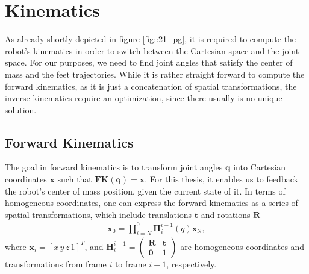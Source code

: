 \FloatBarrier
\section{Kinematics}
\label{sec::24_k}
As already shortly depicted in figure \ref{fig::21_pg}, it is required to compute the robot's kinematics in order to switch between the Cartesian space and the joint space. For our purposes, we need to find joint angles that satisfy the center of mass and the feet trajectories. While it is rather straight forward to compute the forward kinematics, as it is just a concatenation of spatial transformations, the inverse kinematics require an optimization, since there usually is no unique solution.
\FloatBarrier
\subsection{Forward Kinematics}
\label{sec::241_fk}
The goal in forward kinematics is to transform joint angles $\bm{q}$ into Cartesian coordinates $\bm{x}$ such that $\textbf{FK}(\bm{q}) = \bm{x}$. For this thesis, it enables us to feedback the robot's center of mass position, given the current state of it. In terms of homogeneous coordinates, one can express the forward kinematics as a series of spatial transformations, which include translations $\bm{t}$ and rotations $\bm{R}$ 
\begin{align}
	\bm{x}_\text{0} = \prod_{i=N}^{0}\bm{H}_i^{i-1}(q)\bm{x}_\text{N},
\end{align}
where $\bm{x}_i=[x\,y\,z\,1]^T$, and $\bm{H}_i^{i-1}=\begin{pmatrix}\bm{R} & \bm{t} \\ \bm{0} & 1 \end{pmatrix}$ are homogeneous coordinates and transformations from frame $i$ to frame $i-1$, respectively.
\FloatBarrier
